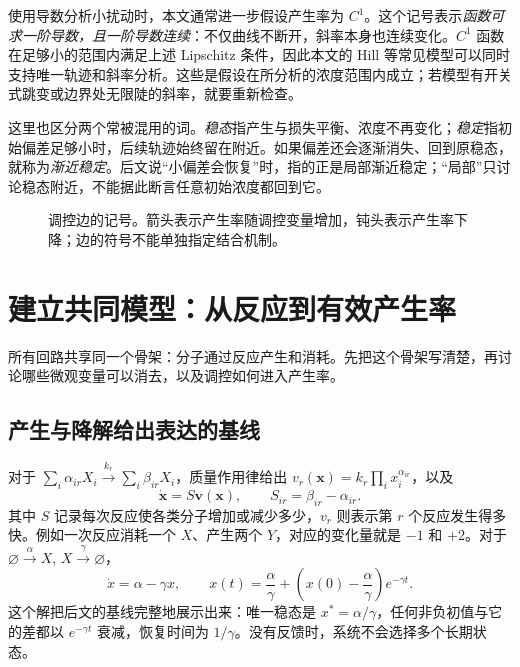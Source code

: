 \documentclass[11pt,a4paper,UTF8,fontset=fandol]{ctexart}
\begin{document}
使用导数分析小扰动时，本文通常进一步假设产生率为 $C^1$。这个记号表示\emph{函数可求一阶导数，且一阶导数连续}：不仅曲线不断开，斜率本身也连续变化。$C^1$ 函数在足够小的范围内满足上述 Lipschitz 条件，因此本文的 Hill 等常见模型可以同时支持唯一轨迹和斜率分析。这些是假设在所分析的浓度范围内成立；若模型有开关式跳变或边界处无限陡的斜率，就要重新检查。

这里也区分两个常被混用的词。\emph{稳态}指产生与损失平衡、浓度不再变化；\emph{稳定}指初始偏差足够小时，后续轨迹始终留在附近。如果偏差还会逐渐消失、回到原稳态，就称为\emph{渐近稳定}。后文说“小偏差会恢复”时，指的正是局部渐近稳定；“局部”只讨论稳态附近，不能据此断言任意初始浓度都回到它。

\begin{figure}[H]\centering
{}
\caption{调控边的记号。箭头表示产生率随调控变量增加，钝头表示产生率下降；边的符号不能单独指定结合机制。}\label{fig:signs}
\end{figure}

\section{建立共同模型：从反应到有效产生率}
所有回路共享同一个骨架：分子通过反应产生和消耗。先把这个骨架写清楚，再讨论哪些微观变量可以消去，以及调控如何进入产生率。
\subsection{产生与降解给出表达的基线}
对于 $\sum_i\alpha_{ir}X_i\xrightarrow{k_r}\sum_i\beta_{ir}X_i$，质量作用律给出 $v_r(\bm x)=k_r\prod_i x_i^{\alpha_{ir}}$，以及
\begin{equation}\dot{\bm x}=S\bm v(\bm x),\qquad S_{ir}=\beta_{ir}-\alpha_{ir}.\end{equation}
其中 $S$ 记录每次反应使各类分子增加或减少多少，$v_r$ 则表示第 $r$ 个反应发生得多快。例如一次反应消耗一个 $X$、产生两个 $Y$，对应的变化量就是 $-1$ 和 $+2$。对于 $\varnothing\xrightarrow{\alpha}X$, $X\xrightarrow{\gamma}\varnothing$，
\begin{equation}\dot x=\alpha-\gamma x,\qquad x(t)=\frac\alpha\gamma+\left(x(0)-\frac\alpha\gamma\right)e^{-\gamma t}.\end{equation}
这个解把后文的基线完整地展示出来：唯一稳态是 $x^*=\alpha/\gamma$，任何非负初值与它的差都以 $e^{-\gamma t}$ 衰减，恢复时间为 $1/\gamma$。没有反馈时，系统不会选择多个长期状态。
\end{document}
